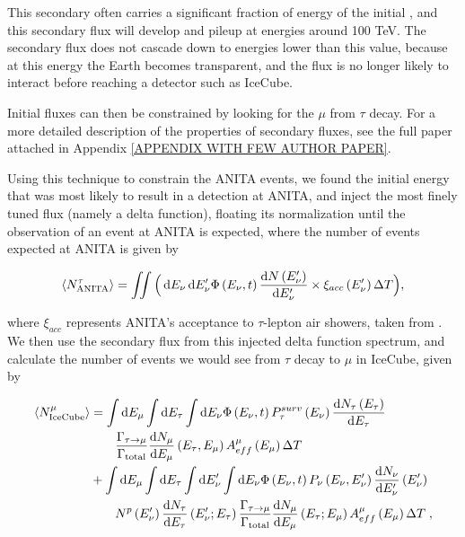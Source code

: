 This secondary \nutau often carries a significant fraction of energy of the initial \nutau, and this secondary \nutau flux will develop and pileup at energies around 100 TeV. The secondary flux does not cascade down to energies lower than this value, because at this energy the Earth becomes transparent, and the \nutau flux is no longer likely to interact before reaching a detector such as IceCube. 

Initial \nutau fluxes can then be constrained by looking for the $\mu$ from $\tau$ decay. For a more detailed description of the properties of secondary fluxes, see the full paper attached in Appendix \ref{APPENDIX WITH FEW AUTHOR PAPER}.

Using this technique to constrain the ANITA events, we found the initial \nutau energy that was most likely to result in a detection at ANITA, and inject the most finely tuned flux (namely a delta function), floating its normalization until the observation of an event at ANITA is expected, where the number of events expected at ANITA is given by

\begin{equation}
    \langle N ^ { \tau }_{\mathrm{ANITA}} \rangle = \iint \Big( \mathop{}\!\mathrm{d} E _ { \nu } \mathop{}\!\mathrm{d} E^{\prime} _ { \nu } \Phi \left( E _ { \nu }, t \right) \frac { \mathop{}\!\mathrm{d} N \left( E^{\prime} _ { \nu } \right) } { \mathop{}\!\mathrm{d} E^{\prime} _ { \nu } } \times \xi _ { a c c } \left( E^{\prime} _ { \nu } \right) \Delta T \Big) ,
\end{equation}

where $\xi_{acc}$ represents ANITA's acceptance to $\tau$-lepton air showers, taken from \citep{Romero-Wolf:2018zxt}. We then use the secondary \nutau flux from this injected delta function spectrum, and calculate the number of events we would see from $\tau$ decay to $\mu$ in IceCube, given by

\begin{align}
\langle N _ { \text {IceCube} } ^ { \mu } \rangle & = \int \diff E _ { \mu } \int \diff E _ { \tau } \int \diff E _ { \nu } \Phi \left( E _ { \nu }, t \right) P _ { \tau } ^ { s u r v } \left( E _ { \nu } \right) \frac { \diff N _ { \tau } \left( E _ { \tau } \right) }{ \diff E _ { \tau } }  \\
& \qquad \frac{\Gamma_{\tau\rightarrow\mu}}{\Gamma_{\rm{total}}} \frac { \diff N _ { \mu } } { \diff E _ { \mu } } \left( E _ { \tau } , E _ { \mu } \right) A _ { e f f } ^ { \mu } \left( E _ { \mu } \right) \Delta T \nonumber
\\ & + \int \diff E _ { \mu } \int \diff E _ { \tau } \int \diff E _ { \nu } ^ { \prime } \int \diff E _ { \nu } \Phi \left( E _ { \nu }, t \right) P _ { \nu } \left( E _ { \nu } , E _ { \nu } ^ { \prime } \right) \frac { \diff N _ { \nu } } { \diff E _ { \nu } ^ { \prime } } \left( E _ { \nu } ^ { \prime } \right) \nonumber \\ 
& \qquad N^{p} \left( E^{\prime}_{\nu} \right) \frac { \diff N _ { \tau } } { \diff E _ { \tau } } \left( E ^{\prime} _ { \nu} ; E _ { \tau} \right)  \frac{\Gamma_{\tau\rightarrow\mu}}{\Gamma_{\rm{total}}} \frac { \diff N _ { \mu } } { \diff E _ { \mu } } \left( E _ { \tau} ; E _ { \mu} \right) A _ { e f f } ^ { \mu } \left( E _ { \mu } \right) \Delta T \; , \nonumber
\end{align}

